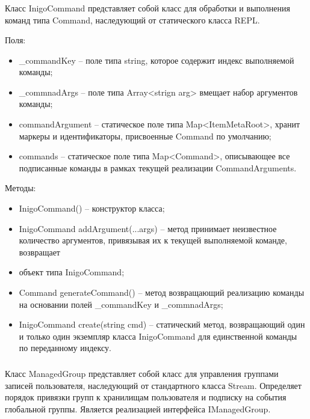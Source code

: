 \subsubsection{}
\label{sub:arch_and_mod:probab_net:inigoCommand}

Класс InigoCommand представляет собой класс для обработки и выполнения команд типа Command, наследующий от статического класса REPL.

Поля:
\begin{itemize}
  \item \_commandKey – поле типа string, которое содержит индекс выполняемой команды;
  \item \_commnadArgs – поле типа Array<strign arg> вмещает набор аргументов команды;
  \item commandArgument – статическое поле типа Map<ItemMetaRoot>, хранит маркеры и идентификаторы, присвоенные Command по умолчанию;
  \item commands – статическое поле типа Map<Command>, описывающее все подписанные команды в рамках текущей реализации CommandArguments.
\end{itemize}

Методы:
\begin{itemize}
  \item InigoCommand() – конструктор класса;
  \item InigoCommand addArgument(...args) – метод принимает неизвестное количество аргументов, привязывая их к текущей выполняемой команде, возвращает
  \item объект типа InigoCommand;
  \item Command generateCommand() – метод возвращающий реализацию команды на основании полей \_commandKey и \_commnadArgs;
  \item InigoCommand create(string cmd) – статический метод, возвращающий один и только один экземпляр класса InigoCommand для единственной команды по переданному индексу.
\end{itemize}

\subsubsection{}
\label{sub:arch_and_mod:probab_net:managedgroup}

Класс ManagedGroup представляет собой класс для управления группами записей пользователя, наследующий от стандартного класса Stream. Определяет порядок привязки групп к хранилищам пользователя и подписку на события глобальной группы. Является реализацией интерфейса IManagedGroup.

